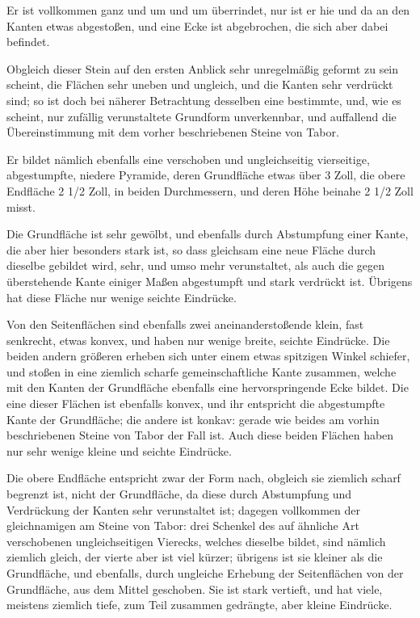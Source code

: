 \documentclass[a4paper, 11pt, oneside, german]{article}
\begin{document}
Er ist vollkommen ganz und um und um überrindet, nur ist er hie und da an den Kanten etwas abgestoßen, und eine Ecke ist abgebrochen, die sich aber dabei befindet.

Obgleich dieser Stein auf den ersten Anblick sehr unregelmäßig geformt zu sein scheint, die Flächen sehr uneben und ungleich, und die Kanten sehr verdrückt sind; so ist doch bei näherer Betrachtung desselben eine bestimmte, und, wie es scheint, nur zufällig verunstaltete Grundform unverkennbar, und auffallend die Übereinstimmung mit dem vorher beschriebenen Steine von Tabor.

Er bildet nämlich ebenfalls eine verschoben und ungleichseitig vierseitige, abgestumpfte, niedere Pyramide, deren Grundfläche etwas über 3 Zoll, die obere Endfläche 2 1/2 Zoll, in beiden Durchmessern, und deren Höhe beinahe 2 1/2 Zoll misst.

Die Grundfläche ist sehr gewölbt, und ebenfalls durch Abstumpfung einer Kante, die aber hier besonders stark ist, so dass gleichsam eine neue Fläche durch dieselbe gebildet wird, sehr, und umso mehr verunstaltet, als auch die gegen überstehende Kante einiger Maßen abgestumpft und stark verdrückt ist. Übrigens hat diese Fläche nur wenige seichte Eindrücke.

Von den Seitenflächen sind ebenfalls zwei aneinanderstoßende klein, fast senkrecht, etwas konvex, und haben nur wenige breite, seichte Eindrücke. Die beiden andern größeren erheben sich unter einem etwas spitzigen Winkel schiefer, und stoßen in eine ziemlich scharfe gemeinschaftliche Kante zusammen, welche mit den Kanten der Grundfläche ebenfalls eine hervorspringende Ecke bildet. Die eine dieser Flächen ist ebenfalls konvex, und ihr entspricht die abgestumpfte Kante der Grundfläche; die andere ist konkav: gerade wie beides am vorhin beschriebenen Steine von Tabor der Fall ist. Auch diese beiden Flächen haben nur sehr wenige kleine und seichte Eindrücke.

Die obere Endfläche entspricht zwar der Form nach, obgleich sie ziemlich scharf begrenzt ist, nicht der Grundfläche, da diese durch Abstumpfung und Verdrückung der Kanten sehr verunstaltet ist; dagegen vollkommen der gleichnamigen am Steine von Tabor: drei Schenkel des auf ähnliche Art verschobenen ungleichseitigen Vierecks, welches dieselbe bildet, sind nämlich ziemlich gleich, der vierte aber ist viel kürzer; übrigens ist sie kleiner als die Grundfläche, und ebenfalls, durch ungleiche Erhebung der Seitenflächen von der Grundfläche, aus dem Mittel geschoben. Sie ist stark vertieft, und hat viele, meistens ziemlich tiefe, zum Teil zusammen gedrängte, aber kleine Eindrücke.
\end{document}
